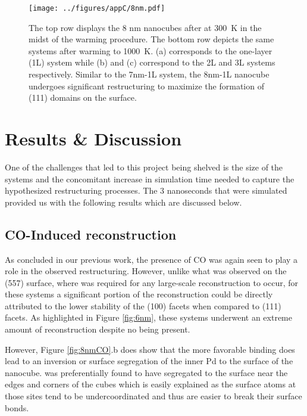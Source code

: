 \begin{landscape}
\begin{figure}[p!]
\centering
  \texttt{[image: ../figures/appC/8nm.pdf]}
  \caption{The top row displays the 8 nm nanocubes after at 300~K in the midst of the warming procedure. 
The bottom row depicts the same systems after warming to
1000~K.  (a) corresponds to the one-layer (1L) system while (b) and (c)
correspond to the 2L and 3L systems respectively. Similar to the 7nm-1L system,
the 8nm-1L nanocube undergoes significant restructuring to maximize the
formation of (111) domains on the surface.}
  \label{fig:8nm}
\end{figure}
\end{landscape}



\section{Results \& Discussion}
One of the challenges that led to this project being shelved is the size of the
systems and the concomitant increase in simulation time needed to capture the
hypothesized restructuring processes. The 3 nanoseconds that were simulated
provided us with the following results which are discussed below.


\subsection{CO-Induced reconstruction}
As concluded in our previous work\citep{Michalka:2013aa}, the presence of CO was again
seen to play a role in the observed restructuring. However, unlike what was
observed on the  (557) surface, where  was
required for any large-scale reconstruction to occur, for these systems a
significant portion of the reconstruction could be directly attributed to the lower
stability of the (100) facets when compared to (111) facets. As highlighted in
Figure \ref{fig:6nm}, these systems underwent an extreme amount of
reconstruction despite no  being present. 

However, Figure \ref{fig:8nmCO}.b does show that the more favorable
 binding does lead to an inversion or surface segregation of
the inner Pd to the surface of the nanocube.  was preferentially found
to have segregated to the surface near the edges and corners of the cubes which
is easily explained as the surface atoms at those sites tend to be
undercoordinated and thus are easier to break their surface bonds.

